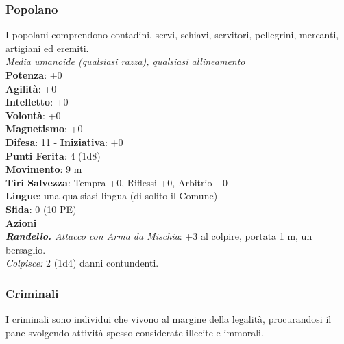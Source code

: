 \begin{multicols}{2}
\subsubsection{Popolano}
I popolani comprendono contadini, servi, schiavi, servitori, pellegrini, mercanti, artigiani ed eremiti.\\
\emph{Media umanoide (qualsiasi razza), qualsiasi allineamento}\\
\textbf{Potenza}: +0\\
\textbf{Agilità}: +0\\
\textbf{Intelletto}: +0\\
\textbf{Volontà}: +0\\
\textbf{Magnetismo}: +0\\
\textbf{Difesa}: 11 - \textbf{Iniziativa}: +0\\
\textbf{Punti Ferita}: 4 (1d8)\\
\textbf{Movimento}: 9 m\\
\textbf{Tiri Salvezza}: Tempra +0, Riflessi +0, Arbitrio +0 \\
\textbf{Lingue}: una qualsiasi lingua (di solito il Comune)\\
\textbf{Sfida}: 0 (10 PE)\smallskip\\
\smallskip\textbf{Azioni}\\
\emph{\textbf{Randello.} Attacco con Arma da Mischia}: +3 al colpire, portata 1 m, un bersaglio.\\
\emph{Colpisce:} 2 (1d4) danni contundenti.\\

\subsubsection{Criminali}

I criminali sono individui che vivono al margine della legalità, procurandosi il pane svolgendo attività spesso considerate illecite e immorali.\\


\end{multicols}
